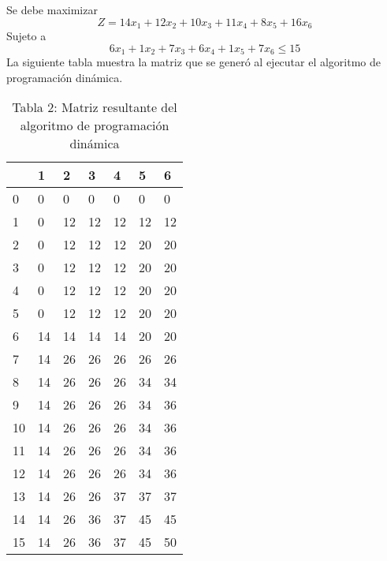 \documentclass{article}
\begin{document}
Se debe maximizar $$Z = 14x_1+12x_2+10x_3+11x_4+8x_5+16x_6$$ 
Sujeto a $$6x_1+1x_2+7x_3+6x_4+1x_5+7x_6\leq 15$$
La siguiente tabla muestra la matriz que se generó al ejecutar el algoritmo de programación dinámica.
\begin{table}[h]
\centering
\caption*{Tabla 2: Matriz resultante del algoritmo de programación dinámica}
\begin{tabularx}{\textwidth}{|X|X|X|X|X|X|X|}
\hline&1&2&3&4&5&6 \\
\hline 0&\cellcolor{red}0&\cellcolor{red}0&\cellcolor{red}0&\cellcolor{red}0&\cellcolor{red}0&\cellcolor{red}0\\
\hline 1&\cellcolor{red}0&\cellcolor{green}12&\cellcolor{red}12&\cellcolor{red}12&\cellcolor{red}12&\cellcolor{red}12\\
\hline 2&\cellcolor{red}0&\cellcolor{green}12&\cellcolor{red}12&\cellcolor{red}12&\cellcolor{green}20&\cellcolor{red}20\\
\hline 3&\cellcolor{red}0&\cellcolor{green}12&\cellcolor{red}12&\cellcolor{red}12&\cellcolor{green}20&\cellcolor{red}20\\
\hline 4&\cellcolor{red}0&\cellcolor{green}12&\cellcolor{red}12&\cellcolor{red}12&\cellcolor{green}20&\cellcolor{red}20\\
\hline 5&\cellcolor{red}0&\cellcolor{green}12&\cellcolor{red}12&\cellcolor{red}12&\cellcolor{green}20&\cellcolor{red}20\\
\hline 6&\cellcolor{green}14&\cellcolor{red}14&\cellcolor{red}14&\cellcolor{red}14&\cellcolor{green}20&\cellcolor{red}20\\
\hline 7&\cellcolor{green}14&\cellcolor{green}26&\cellcolor{red}26&\cellcolor{red}26&\cellcolor{red}26&\cellcolor{red}26\\
\hline 8&\cellcolor{green}14&\cellcolor{green}26&\cellcolor{red}26&\cellcolor{red}26&\cellcolor{green}34&\cellcolor{red}34\\
\hline 9&\cellcolor{green}14&\cellcolor{green}26&\cellcolor{red}26&\cellcolor{red}26&\cellcolor{green}34&\cellcolor{green}36\\
\hline 10&\cellcolor{green}14&\cellcolor{green}26&\cellcolor{red}26&\cellcolor{red}26&\cellcolor{green}34&\cellcolor{green}36\\
\hline 11&\cellcolor{green}14&\cellcolor{green}26&\cellcolor{red}26&\cellcolor{red}26&\cellcolor{green}34&\cellcolor{green}36\\
\hline 12&\cellcolor{green}14&\cellcolor{green}26&\cellcolor{red}26&\cellcolor{red}26&\cellcolor{green}34&\cellcolor{green}36\\
\hline 13&\cellcolor{green}14&\cellcolor{green}26&\cellcolor{red}26&\cellcolor{green}37&\cellcolor{red}37&\cellcolor{red}37\\
\hline 14&\cellcolor{green}14&\cellcolor{green}26&\cellcolor{green}36&\cellcolor{green}37&\cellcolor{green}45&\cellcolor{red}45\\
\hline 15&\cellcolor{green}14&\cellcolor{green}26&\cellcolor{green}36&\cellcolor{green}37&\cellcolor{green}45&\cellcolor{green}50\\
\hline
\end{tabularx}
\end{table}
\end{document}
